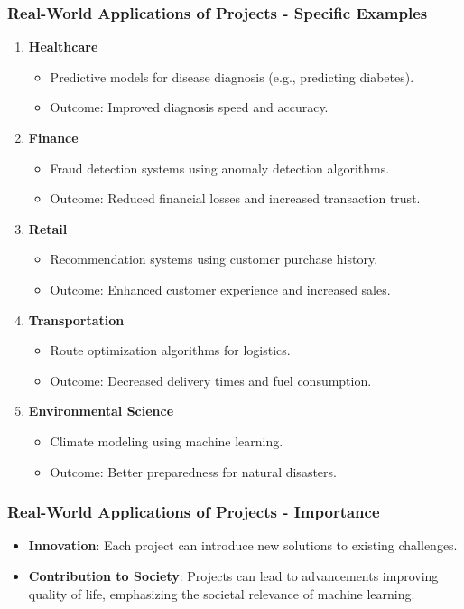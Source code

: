 \documentclass[aspectratio=169]{beamer}
\begin{document}
\begin{frame}[fragile]
    \frametitle{Real-World Applications of Projects - Specific Examples}
    \begin{enumerate}
        \item \textbf{Healthcare}
            \begin{itemize}
                \item Predictive models for disease diagnosis (e.g., predicting diabetes).
                \item Outcome: Improved diagnosis speed and accuracy.
            \end{itemize}
        \item \textbf{Finance}
            \begin{itemize}
                \item Fraud detection systems using anomaly detection algorithms.
                \item Outcome: Reduced financial losses and increased transaction trust.
            \end{itemize}
        \item \textbf{Retail}
            \begin{itemize}
                \item Recommendation systems using customer purchase history.
                \item Outcome: Enhanced customer experience and increased sales.
            \end{itemize}
        \item \textbf{Transportation}
            \begin{itemize}
                \item Route optimization algorithms for logistics.
                \item Outcome: Decreased delivery times and fuel consumption.
            \end{itemize}
        \item \textbf{Environmental Science}
            \begin{itemize}
                \item Climate modeling using machine learning.
                \item Outcome: Better preparedness for natural disasters.
            \end{itemize}
    \end{enumerate}
\end{frame}

\begin{frame}[fragile]
    \frametitle{Real-World Applications of Projects - Importance}
    \begin{itemize}
        \item \textbf{Innovation}: Each project can introduce new solutions to existing challenges.
        \item \textbf{Contribution to Society}: Projects can lead to advancements improving quality of life, emphasizing the societal relevance of machine learning.
    \end{itemize}
\end{frame}
\end{document}
